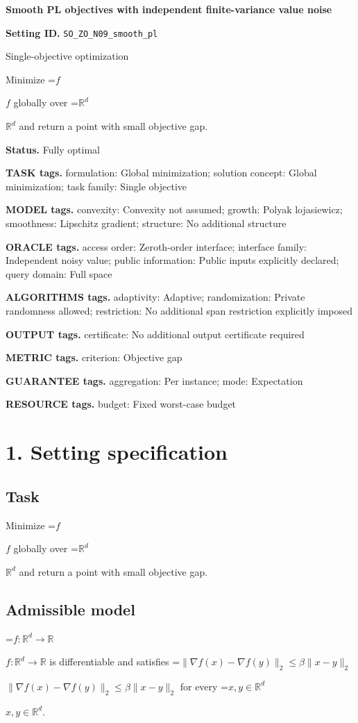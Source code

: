 \documentclass[10pt,a4paper]{article}
\newcommand{\AtlasMath}[1]{\par\begingroup\centering\setbox0=\hbox{$\displaystyle #1$}\ifdim\wd0>1.4\linewidth\typeout{ATLAS WIDE FORMULA: \the\wd0}\fi\ifdim\wd0>\linewidth\resizebox{\linewidth}{!}{\box0}\else\box0\fi\par\endgroup}
\newcommand{\AtlasInlineMath}[1]{\begingroup\setbox0=\hbox{$#1$}\ifdim\wd0>.4\linewidth\endgroup\AtlasMath{#1}\else\endgroup$#1$\fi}
\begin{document}
\raggedright

{\LARGE\bfseries\sffamily\color{AtlasNavy} Smooth PL objectives with independent finite-variance value noise\par}\vspace{5pt}
\textbf{Setting ID.} \texttt{SO\_\allowbreak{}ZO\_\allowbreak{}N09\_\allowbreak{}smooth\_\allowbreak{}pl}

Single-objective optimization

Minimize \AtlasInlineMath{f} globally over \AtlasInlineMath{\mathbb{R}^d} and return a point with small objective gap.

\textbf{Status.} Fully optimal

\textbf{TASK tags.} formulation: Global minimization; solution concept: Global minimization; task family: Single objective

\textbf{MODEL tags.} convexity: Convexity not assumed; growth: Polyak lojasiewicz; smoothness: Lipschitz gradient; structure: No additional structure

\textbf{ORACLE tags.} access order: Zeroth-order interface; interface family: Independent noisy value; public information: Public inputs explicitly declared; query domain: Full space

\textbf{ALGORITHMS tags.} adaptivity: Adaptive; randomization: Private randomness allowed; restriction: No additional span restriction explicitly imposed

\textbf{OUTPUT tags.} certificate: No additional output certificate required

\textbf{METRIC tags.} criterion: Objective gap

\textbf{GUARANTEE tags.} aggregation: Per instance; mode: Expectation

\textbf{RESOURCE tags.} budget: Fixed worst-case budget

\section{1. Setting specification}
\subsection{Task}
Minimize \AtlasInlineMath{f} globally over \AtlasInlineMath{\mathbb{R}^d} and return a point with small objective gap.

\subsection{Admissible model}
\AtlasInlineMath{f:\mathbb{R}^d\to\mathbb{R}} is differentiable and satisfies \AtlasInlineMath{\|\nabla f(x)-\nabla f(y)\|_2\le\beta\|x-y\|_2} for every \AtlasInlineMath{x,y\in\mathbb{R}^d}.
\end{document}
